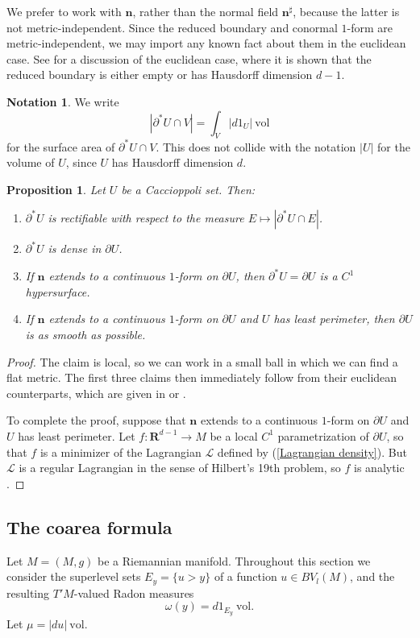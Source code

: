 \documentclass[reqno,12pt,letterpaper]{amsart}
\newcommand{\RR}{\mathbf{R}}
\newcommand{\normal}{\mathbf n}
\newcommand{\vol}{\mathrm{vol}}
\newtheorem{proposition}[theorem]{Proposition}
\theoremstyle{definition}
\newtheorem{notation}[theorem]{Notation}
\numberwithin{equation}{section}
\begin{document}
We prefer to work with $\normal$, rather than the normal field $\normal^\sharp$, because the latter is not metric-independent.
Since the reduced boundary and conormal $1$-form are metric-independent, we may import any known fact about them in the euclidean case.
See \cite[Chapters 2-4]{Giusti77} for a discussion of the euclidean case, where it is shown that the reduced boundary is either empty or has Hausdorff dimension $d - 1$.

\begin{notation}
We write
$$|\partial^* U \cap V| = \int_V |d1_U| ~\vol$$
for the surface area of $\partial^* U \cap V$.
This does not collide with the notation $|U|$ for the volume of $U$, since $U$ has Hausdorff dimension $d$.
\end{notation}

\begin{proposition}\label{regularity of reduced boundary}
Let $U$ be a Caccioppoli set.
Then:
\begin{enumerate}
\item $\partial^* U$ is rectifiable with respect to the measure $E \mapsto |\partial^* U \cap E|$.
\item $\partial^* U$ is dense in $\partial U$.
\item If $\normal$ extends to a continuous $1$-form on $\partial U$, then $\partial^* U = \partial U$ is a $C^1$ hypersurface.
\item If $\normal$ extends to a continuous $1$-form on $\partial U$ and $U$ has least perimeter, then $\partial U$ is as smooth as possible.
\end{enumerate}
\end{proposition}
\begin{proof}
The claim is local, so we can work in a small ball in which we can find a flat metric.
The first three claims then immediately follow from their euclidean counterparts, which are given in \cite[Chapter 4]{Giusti77} or \cite{deGiorgi55}.

To complete the proof, suppose that $\normal$ extends to a continuous $1$-form on $\partial U$ and $U$ has least perimeter.
Let $f: \RR^{d - 1} \to M$ be a local $C^1$ parametrization of $\partial U$, so that $f$ is a minimizer of the Lagrangian $\mathscr L$ defined by (\ref{Lagrangian density}).
But $\mathscr L$ is a regular Lagrangian in the sense of Hilbert's 19th problem, so $f$ is analytic \cite{morrey2009multiple}.
\end{proof}


\subsection{The coarea formula} \label{coarea section}
Let $M = (M, g)$ be a Riemannian manifold.
Throughout this section we consider the superlevel sets $E_y = \{u > y\}$ of a function $u \in BV_l(M)$, and the resulting $T'M$-valued Radon measures
$$\omega(y) = d1_{E_y} ~\vol.$$
Let $\mu = |du| ~\vol$.
\end{document}

